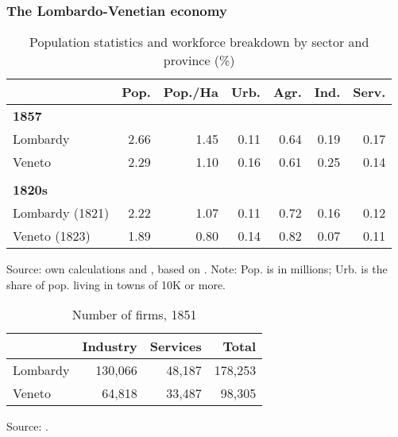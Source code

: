 \documentclass[10pt]{beamer}
\begin{document}
\begin{frame}
    \frametitle{The Lombardo-Venetian economy}

\begin{table}[!h]
\caption{Population statistics and workforce breakdown by sector and province (\%)}
\centering
\fontsize{7}{7}\selectfont

    \begin{tabular}{l r r r r r r}  
        \toprule
         & Pop. & Pop./Ha & Urb. & Agr. & Ind. & Serv.    \\ 
        \midrule
        \textbf{1857}   \\
        Lombardy & 2.66 & 1.45 & 0.11 & 0.64 & 0.19 & 0.17 \\
        Veneto & 2.29 & 1.10 & 0.16 & 0.61 & 0.25 & 0.14 \\
        \\
        \textbf{1820s}  \\
        Lombardy (1821) &  2.22 & 1.07 & 0.11 & 0.72 & 0.16 & 0.12 \\
        Veneto (1823) & 1.89 & 0.80 & 0.14 & 0.82 & 0.07 & 0.11 \\

        \bottomrule    
    \end{tabular}
    
    Source: own calculations and \cite{chilosi2021}, based on \cite{maic1862}. Note: Pop. is in millions; Urb. is the share of pop. living in towns of 10K or more.

\end{table}

  

\begin{table}[!h]
\caption{Number of firms, 1851}
\centering
\fontsize{7}{7}\selectfont

    \begin{tabular}{l r r r}  
        \toprule
         & Industry & Services & Total   \\ 
        \midrule
        Lombardy & 130,066 & 48,187 & 178,253 \\
        Veneto & 64,818 & 33,487 & 98,305 \\
        \bottomrule    
    \end{tabular}
    
    Source: \cite{mittheilungen1855}.

\end{table}


\end{frame}
\end{document}
